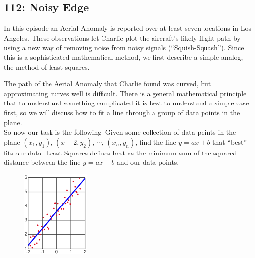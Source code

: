 \newpage
\subsection{112: Noisy Edge\label{112}}

In this episode an Aerial Anomaly is reported over at least seven locations in Los Angeles. These observations let Charlie plot the aircraft's likely flight path by using a new way of removing noise from noisy signals (``Squish-Squash''). Since this is a sophisticated mathematical method, we first describe a simple analog, the method of least squares. \\


The path of the Aerial Anomaly that Charlie found was curved, but approximating curves well is difficult. There is a general mathematical principle that to understand something complicated it is best to understand a simple case first, so we will discuss how to fit a line through a group of data points in the plane. \\

So now our task is the following. Given some collection of data points in the plane $(x_1,y_1)$, $(x+2,y_2)$, $\cdots$, $(x_n,y_n)$, find the line $y=ax+b$ that ``best'' fits our data. Least Squares defines best as the minimum sum of the squared distance between the line $y=ax+b$ and our data points. \\

	\begin{figure}[H]
	   \centering
	   \includegraphics[width=0.3\textwidth]{season1/112/images/data.jpg} 
	\end{figure}

 \vspace{0.2cm}

